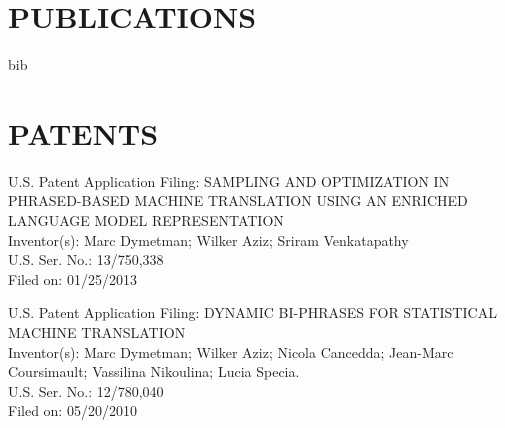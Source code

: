 \section*{PUBLICATIONS}

\begin{btSect}{bib}
\btPrintNotCited
\end{btSect}



%

\section*{PATENTS}

\begin{description}
\item U.S. Patent Application Filing: SAMPLING AND OPTIMIZATION IN PHRASED-BASED MACHINE TRANSLATION USING AN ENRICHED LANGUAGE MODEL REPRESENTATION \\
Inventor(s): Marc Dymetman; Wilker Aziz; Sriram Venkatapathy \\
U.S. Ser. No.:  13/750,338 \\
Filed on: 01/25/2013 
\end{description}

\begin{description}
\item U.S. Patent Application Filing: DYNAMIC BI-PHRASES FOR STATISTICAL MACHINE TRANSLATION  \\
Inventor(s): Marc Dymetman; Wilker Aziz; Nicola Cancedda; Jean-Marc Coursimault;  Vassilina Nikoulina; Lucia Specia. \\
U.S. Ser. No.:  12/780,040 \\
Filed on: 05/20/2010  \\
\end{description}